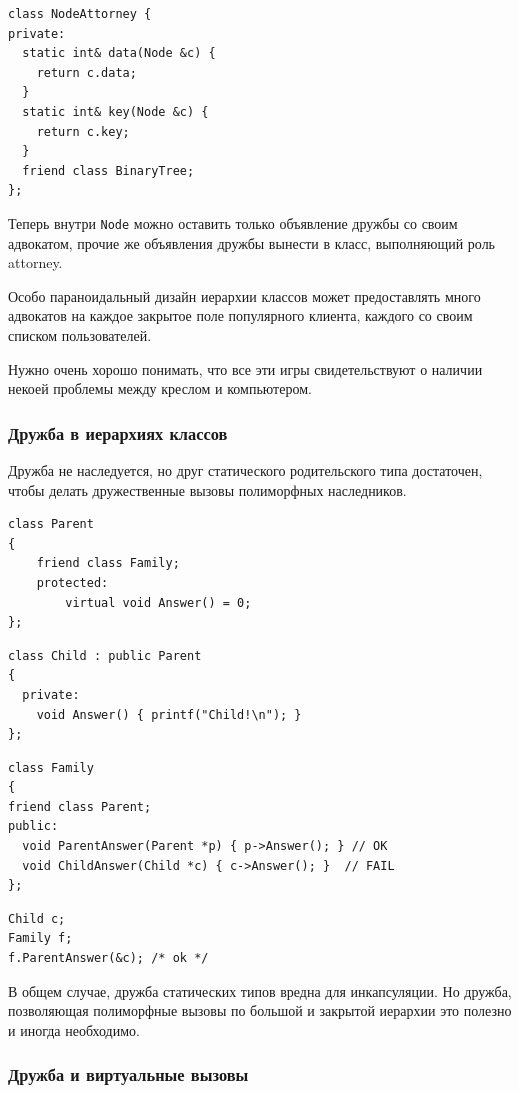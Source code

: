 \documentclass[a4paper,12pt,oneside]{article}
\begin{document}
\begin{lstlisting}
class NodeAttorney {
private:
  static int& data(Node &c) {
    return c.data;
  } 
  static int& key(Node &c) {
    return c.key;
  } 
  friend class BinaryTree;
};
\end{lstlisting}

Теперь внутри \lstinline!Node! можно оставить только объявление дружбы со своим адвокатом, прочие же объявления дружбы вынести в класс, выполняющий роль attorney.

Особо параноидальный дизайн иерархии классов может предоставлять много адвокатов на каждое закрытое поле популярного клиента, каждого со своим списком пользователей.

Нужно очень хорошо понимать, что все эти игры свидетельствуют о наличии некоей проблемы между креслом и компьютером.

\subsubsection{Дружба в иерархиях классов}

Дружба не наследуется, но друг статического родительского типа достаточен, чтобы делать дружественные вызовы полиморфных наследников.

\begin{lstlisting}
class Parent
{
    friend class Family;
    protected:
        virtual void Answer() = 0;
};
\end{lstlisting}

\begin{lstlisting}
class Child : public Parent
{
  private:
    void Answer() { printf("Child!\n"); }
};
\end{lstlisting}

\begin{lstlisting}
class Family
{
friend class Parent;
public:
  void ParentAnswer(Parent *p) { p->Answer(); } // OK
  void ChildAnswer(Child *c) { c->Answer(); }  // FAIL
};
\end{lstlisting}

\begin{lstlisting}
Child c;
Family f;
f.ParentAnswer(&c); /* ok */
\end{lstlisting}

В общем случае, дружба статических типов вредна для инкапсуляции. Но дружба, позволяющая полиморфные вызовы по большой и закрытой иерархии это полезно и иногда необходимо. 

\subsubsection{Дружба и виртуальные вызовы}
\end{document}
